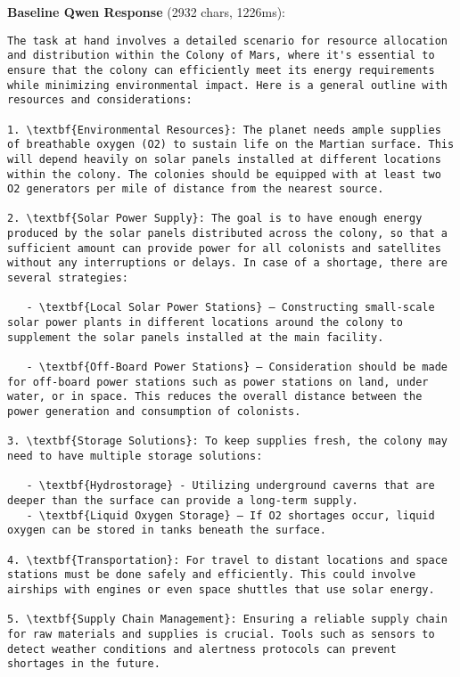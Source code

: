 \documentclass[11pt,a4paper]{article}
\begin{document}
\textbf{Baseline Qwen Response} (2932 chars, 1226ms):
\begin{verbatim}The task at hand involves a detailed scenario for resource allocation and distribution within the Colony of Mars, where it's essential to ensure that the colony can efficiently meet its energy requirements while minimizing environmental impact. Here is a general outline with resources and considerations:

1. \textbf{Environmental Resources}: The planet needs ample supplies of breathable oxygen (O2) to sustain life on the Martian surface. This will depend heavily on solar panels installed at different locations within the colony. The colonies should be equipped with at least two O2 generators per mile of distance from the nearest source.

2. \textbf{Solar Power Supply}: The goal is to have enough energy produced by the solar panels distributed across the colony, so that a sufficient amount can provide power for all colonists and satellites without any interruptions or delays. In case of a shortage, there are several strategies:

   - \textbf{Local Solar Power Stations} – Constructing small-scale solar power plants in different locations around the colony to supplement the solar panels installed at the main facility.
   
   - \textbf{Off-Board Power Stations} – Consideration should be made for off-board power stations such as power stations on land, under water, or in space. This reduces the overall distance between the power generation and consumption of colonists.

3. \textbf{Storage Solutions}: To keep supplies fresh, the colony may need to have multiple storage solutions:

   - \textbf{Hydrostorage} - Utilizing underground caverns that are deeper than the surface can provide a long-term supply.
   - \textbf{Liquid Oxygen Storage} – If O2 shortages occur, liquid oxygen can be stored in tanks beneath the surface.

4. \textbf{Transportation}: For travel to distant locations and space stations must be done safely and efficiently. This could involve airships with engines or even space shuttles that use solar energy.

5. \textbf{Supply Chain Management}: Ensuring a reliable supply chain for raw materials and supplies is crucial. Tools such as sensors to detect weather conditions and alertness protocols can prevent shortages in the future.


\end{verbatim}
\end{document}
